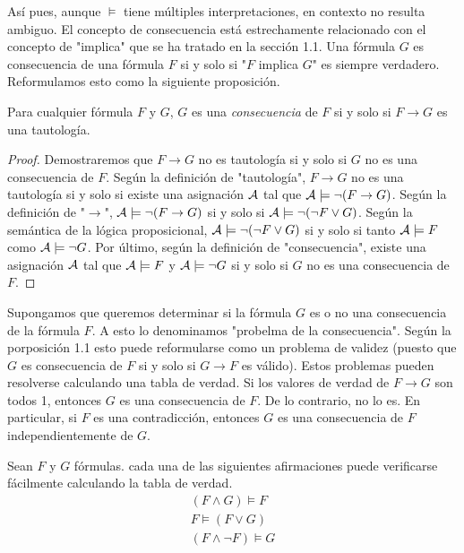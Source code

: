 \documentclass[12pt,a4paper]{book}
\newcommand{\comillas}[1]{"#1"}
\begin{document}
    Así pues, aunque $\models$ tiene múltiples interpretaciones, en contexto no resulta ambiguo. El concepto de consecuencia está estrechamente relacionado con el
    concepto de \comillas{implica} que se ha tratado en la sección 1.1. Una fórmula $G$ es consecuencia de una fórmula $F$ si y solo si \comillas{$F$ implica $G$}
    es siempre verdadero. Reformulamos esto como la siguiente proposición.

    \begin{proposicion}[Consecuencia]
        Para cualquier fórmula $F$ y $G$, $G$ es una \textit{consecuencia} de $F$ si y solo si $F\rightarrow G$ es una tautología.
    \end{proposicion}

    \begin{proof}
        Demostraremos que $F\rightarrow G$ no es tautología si y solo si $G$ no es una consecuencia de $F$.
        Según la definición de \comillas{tautología}, $F\rightarrow G$ no es una tautología si y solo si existe una asignación $\AA$ tal que
        $\AA\models\neg(F\rightarrow G)$. Según la definición de \comillas{$\rightarrow$}, $\AA\models\neg(F\rightarrow G)$ si y solo si $\AA\models \neg(\neg F\vee G)$.
        Según la semántica de la lógica proposicional, $\AA\models\neg(\neg F\vee G)$ si y solo si tanto $\AA\models F$ como $\AA\models\neg G$. Por último, según la definición
        de \comillas{consecuencia}, existe una asignación $\AA$ tal que $\AA\models F$ y $\AA\models\neg G$ si y solo si $G$ no es una consecuencia de $F$.
    \end{proof}

    Supongamos que queremos determinar si la fórmula $G$ es o no una consecuencia de la fórmula $F$. A esto lo denominamos \comillas{probelma de la consecuencia}.
    Según la porposición 1.1 esto puede reformularse como un problema de validez (puesto que $G$ es consecuencia de $F$ si y solo si $G\rightarrow F$ es válido).
    Estos problemas pueden resolverse calculando una tabla de verdad. Si los valores de verdad de $F\rightarrow G$ son todos 1, entonces $G$ es una consecuencia de $F$.
    De lo contrario, no lo es. En particular, si $F$ es una contradicción, entonces $G$ es una consecuencia de $F$ independientemente de $G$.

    \begin{ejemplo}
        Sean $F$ y $G$ fórmulas. cada una de las siguientes afirmaciones puede verificarse fácilmente calculando la tabla de verdad.
        \begin{gather*}
            (F\wedge G)\models F\\
            F\models(F\vee G)\\
            (F\wedge\neg F)\models G
        \end{gather*}
    \end{ejemplo}
\end{document}
